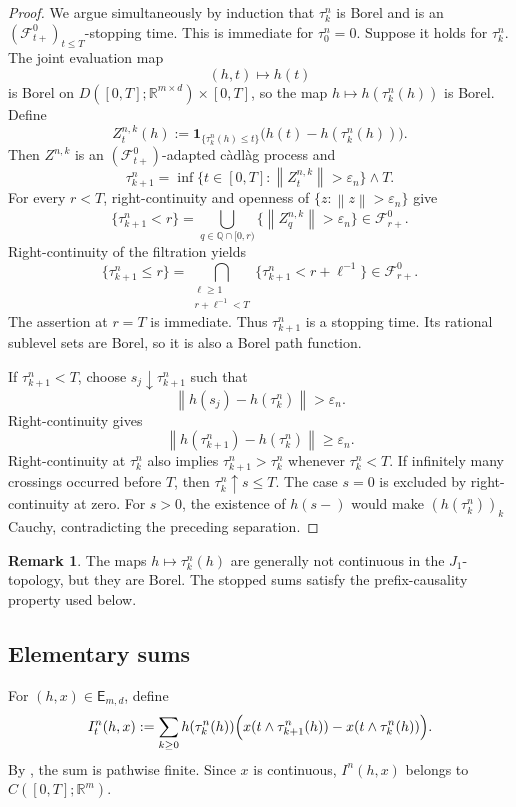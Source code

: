 \documentclass[11pt,reqno]{amsart}
\theoremstyle{plain}
\theoremstyle{definition}
\newtheorem{remark}[remark]{Remark}
\newcommand{\R}{\mathbb R}
\newcommand{\cF}{\mathcal F}
\newcommand{\eps}{\varepsilon}
\newcommand{\one}{\mathbf 1}
\newcommand{\norm}[1]{\left\lVert #1\right\rVert}
\begin{document}
\begin{proof}
We argue simultaneously by induction that \(\tau_k^n\) is Borel and is an
\((\cF_{t+}^0)_{t\le T}\)-stopping time.  This is immediate for
\(\tau_0^n=0\).  Suppose it holds for \(\tau_k^n\).  The joint evaluation map
\[
  (h,t)\longmapsto h(t)
\]
is Borel on
\(D([0,T];\R^{m\times d})\times[0,T]\), so the map
\(h\mapsto h(\tau_k^n(h))\) is Borel.  Define
\[
  Z_t^{n,k}(h)
  :=
  \one_{\{\tau_k^n(h)\le t\}}
  \bigl(h(t)-h(\tau_k^n(h))\bigr).
\]
Then \(Z^{n,k}\) is an \((\cF_{t+}^0)\)-adapted c\`adl\`ag process and
\[
  \tau_{k+1}^n
  =
  \inf\{t\in[0,T]:\norm{Z_t^{n,k}}>\eps_n\}\wedge T.
\]
For every \(r<T\), right-continuity and openness of
\(\{z:\norm z>\eps_n\}\) give
\[
  \{\tau_{k+1}^n<r\}
  =
  \bigcup_{q\in\mathbb Q\cap[0,r)}
  \{\norm{Z_q^{n,k}}>\eps_n\}
  \in\cF_{r+}^0.
\]
Right-continuity of the filtration yields
\[
  \{\tau_{k+1}^n\le r\}
  =
  \bigcap_{\substack{\ell\ge1\\r+\ell^{-1}<T}}
  \{\tau_{k+1}^n<r+\ell^{-1}\}
  \in\cF_{r+}^0.
\]
The assertion at \(r=T\) is immediate.  Thus
\(\tau_{k+1}^n\) is a stopping time.  Its rational sublevel sets are Borel,
so it is also a Borel path function.

If \(\tau_{k+1}^n<T\), choose
\(s_j\downarrow\tau_{k+1}^n\) such that
\[
  \norm{h(s_j)-h(\tau_k^n)}>\eps_n.
\]
Right-continuity gives
\[
  \norm{h(\tau_{k+1}^n)-h(\tau_k^n)}\ge\eps_n.
\]
Right-continuity at \(\tau_k^n\) also implies
\(\tau_{k+1}^n>\tau_k^n\) whenever \(\tau_k^n<T\).  If infinitely many
crossings occurred before \(T\), then \(\tau_k^n\uparrow s\le T\).
The case \(s=0\) is excluded by right-continuity at zero.  For \(s>0\), the
existence of \(h(s-)\) would make \((h(\tau_k^n))_k\) Cauchy, contradicting
the preceding separation.
\end{proof}

\begin{remark}\label{rem:hitting-not-continuous}
The maps \(h\mapsto\tau_k^n(h)\) are generally not continuous in the
\(J_1\)-topology, but they are Borel.  The stopped sums satisfy the
prefix-causality property used below.
\end{remark}

\subsection{Elementary sums}

For \((h,x)\in\mathsf E_{m,d}\), define
\begin{equation}\label{eq:In-def}
  I_t^n(h,x)
  :=
  \sum_{k\ge0}
  h(\tau_k^n(h))
  \Bigl(
    x(t\wedge\tau_{k+1}^n(h))
    -
    x(t\wedge\tau_k^n(h))
  \Bigr).
\end{equation}
By , the sum is pathwise finite.  Since \(x\) is
continuous, \(I^n(h,x)\) belongs to \(C([0,T];\R^m)\).
\end{document}
